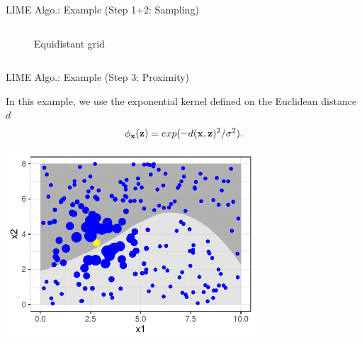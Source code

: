 \documentclass[10pt,compress,t,notes=noshow, xcolor=table]{beamer}
\begin{document}
\begin{frame}{LIME Algo.: Example (Step 1+2: Sampling)}
\begin{columns}[totalwidth=\textwidth]
\begin{column}{0.5\textwidth}
\begin{figure}
			  \vspace{-0.3cm}
    		    \caption{Equidistant grid}
    		\end{figure}   
    \end{column}
\end{columns}
\end{frame}
		
\begin{frame}{LIME Algo.: Example (Step 3: Proximity)}

	In this example, we use the exponential kernel defined on the Euclidean distance $d$
		 $$\phi_{\mathbf{x}}(\mathbf{z}) = exp(-d(\mathbf{x}, \mathbf{z})^2/\sigma^2).$$ 
		\begin{center}
			\includegraphics[width=0.7\textwidth]{figure/lime4}
		\end{center}
		
		
\end{frame}
		
\end{document}
